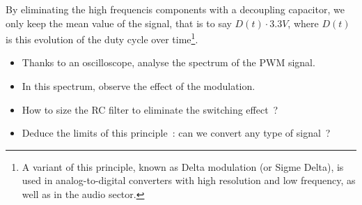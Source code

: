 \documentclass[11pt,a4paper]{article}
\theoremstyle{definition}%
\begin{document}
By eliminating the high frequencis components with a decoupling capacitor, we only keep the mean value of the signal, that is to say $D(t) \cdot 3.3V$, where $D(t)$ is this evolution of the duty cycle over time\footnote{A variant of this principle, known as Delta modulation (or Sigme Delta), is used in analog-to-digital converters with high resolution and low frequency, as well as in the audio sector.}.

\begin{itemize}
	\item Thanks to an oscilloscope, analyse the spectrum of the PWM signal.
	\item In this spectrum, observe the effect of the modulation.
	\item How to size the RC filter to eliminate the switching effect~?
	\item Deduce the limits of this principle~: can we convert any type of signal~?
\end{itemize}
\end{document}
